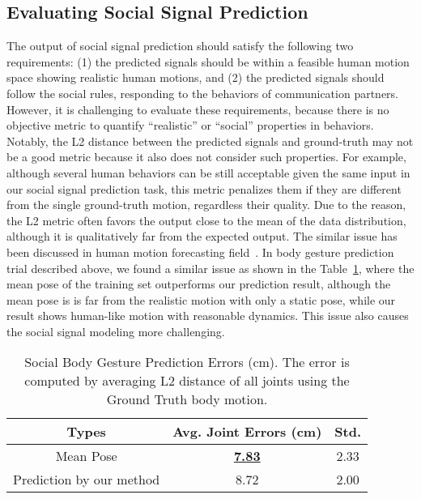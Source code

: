 \subsection{Evaluating Social Signal Prediction}
The output of social signal prediction should satisfy the following two requirements: (1) the predicted signals should be within a feasible human motion space showing realistic human motions, and (2) the predicted signals should follow the social rules, responding to the behaviors of communication partners. However, it is challenging to evaluate these requirements, because there is no objective metric to quantify ``realistic'' or ``social'' properties in behaviors. Notably, the L2 distance between the predicted signals and ground-truth may not be a good metric because it also does not consider such properties. For example, although several human behaviors can be still acceptable given the same input in our social signal prediction task, this metric penalizes them if they are different from the single ground-truth motion, regardless their quality. Due to the reason, the L2 metric often favors the output close to the mean of the data distribution, although it is qualitatively far from the expected output. The similar issue has been discussed in human motion forecasting field~\cite{mnih2012conditional, Fragkiadaki_2015_ICCV, jain2016structural, zhou2018autoconditioned}. In body gesture prediction trial described above, we found a similar issue as shown in the Table~\ref{table:predBody_errors}, where the mean pose of the training set outperforms our prediction result, although the mean pose is is far from the realistic motion with only a static pose, while our result shows human-like motion with reasonable dynamics. This issue also causes the social signal modeling more challenging.


\begin{table}[t]
	\centering
	\begin{tabular}{c| c| c}
		
		\hline
		Types & Avg. Joint Errors (cm) & Std.\\
		\hline
		Mean Pose & \underline {\textbf{7.83}} & 2.33\\
		\hline
		Prediction by our method & 8.72 & 2.00\\
		\hline
	\end{tabular}
	\caption{Social Body Gesture Prediction Errors (cm). The error is computed by averaging L2 distance of all joints using the Ground Truth body motion. \label{table:predBody_errors}}
\end{table}

